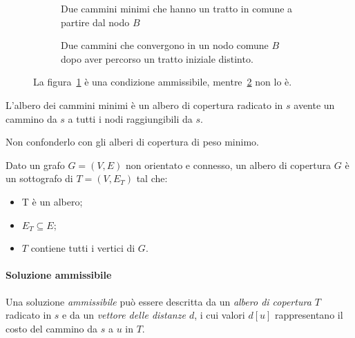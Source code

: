\begin{figure}[H]\centering
	\begin{subfigure}[t]{.5\linewidth}\centering
		
		\caption{Due cammini minimi che hanno un tratto in comune a partire dal nodo \(B\)}%
		\label{fig:walk-common-part}
	\end{subfigure}%
	\begin{subfigure}[t]{.5\linewidth}\centering
		
		\caption{Due cammini che convergono in un nodo comune \(B\) dopo aver percorso un tratto iniziale distinto.}%
		\label{fig:walk-shared-node}
	\end{subfigure}
	\caption{La figura~\ref{fig:walk-common-part} è una condizione ammissibile, mentre~\ref{fig:walk-shared-node} non lo è.}%
	\label{fig:sottostruttura-ottima}
\end{figure}

\begin{definition}
L'albero dei cammini minimi è un albero di copertura radicato in \(s\) avente un cammino da \(s\) a tutti i nodi raggiungibili da \(s\).
\end{definition}

\begin{note}
Non confonderlo con gli alberi di copertura di peso minimo.
\end{note}

\begin{definition}
Dato un grafo \(G = (V, E)\) non orientato e connesso, un albero di copertura \(G\) è un sottografo di \(T = (V, E_T)\) tal che:
\begin{itemize}
	\item T è un albero;
	\item \(E_T \subseteq E\);
	\item \(T\) contiene tutti i vertici di \(G\).
\end{itemize}
\end{definition}

\paragraph{Soluzione ammissibile}
Una soluzione \emph{ammissibile} può essere descritta da un \emph{albero di copertura \(T\)} radicato in \(s\) e da un \emph{vettore delle distanze \(d\)}, i cui valori \(d[u]\) rappresentano il costo del cammino da \(s\) a \(u\) in \(T\).

